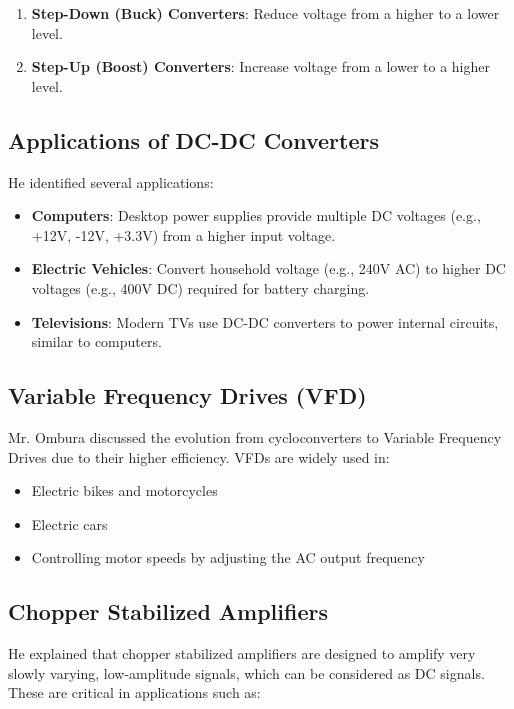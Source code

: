 \begin{enumerate}
    \item \textbf{Step-Down (Buck) Converters}: Reduce voltage from a higher to a lower level.
    \item \textbf{Step-Up (Boost) Converters}: Increase voltage from a lower to a higher level.
\end{enumerate}

\subsection{Applications of DC-DC Converters}

He identified several applications:

\begin{itemize}
    \item \textbf{Computers}: Desktop power supplies provide multiple DC voltages (e.g., +12V, -12V, +3.3V) from a higher input voltage.
    \item \textbf{Electric Vehicles}: Convert household voltage (e.g., 240V AC) to higher DC voltages (e.g., 400V DC) required for battery charging.
    \item \textbf{Televisions}: Modern TVs use DC-DC converters to power internal circuits, similar to computers.
\end{itemize}

\subsection{Variable Frequency Drives (VFD)}

Mr. Ombura discussed the evolution from cycloconverters to Variable Frequency Drives due to their higher efficiency. VFDs are widely used in:

\begin{itemize}
    \item Electric bikes and motorcycles
    \item Electric cars
    \item Controlling motor speeds by adjusting the AC output frequency
\end{itemize}

\subsection{Chopper Stabilized Amplifiers}

He explained that chopper stabilized amplifiers are designed to amplify very slowly varying, low-amplitude signals, which can be considered as DC signals. These are critical in applications such as:

